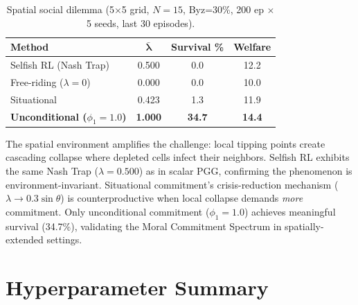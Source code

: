\documentclass{article}
\begin{document}
\begin{table}[h]
\centering
\caption{Spatial social dilemma (5$\times$5 grid, $N{=}15$, Byz=30\%, 200 ep $\times$ 5 seeds, last 30 episodes).}
\label{tab:spatial}
\begin{tabular}{lccc}
\toprule
\textbf{Method} & $\boldsymbol{\bar{\lambda}}$ & \textbf{Survival \%} & \textbf{Welfare} \\
\midrule
Selfish RL (Nash Trap) & 0.500 & 0.0 & 12.2 \\
Free-riding ($\lambda{=}0$) & 0.000 & 0.0 & 10.0 \\
Situational & 0.423 & 1.3 & 11.9 \\
\textbf{Unconditional ($\phi_1{=}1.0$)} & \textbf{1.000} & \textbf{34.7} & \textbf{14.4} \\
\bottomrule
\end{tabular}
\end{table}

\noindent The spatial environment amplifies the challenge: local tipping points create cascading collapse where depleted cells infect their neighbors.
Selfish RL exhibits the same Nash Trap ($\lambda = 0.500$) as in scalar PGG, confirming the phenomenon is environment-invariant.
Situational commitment's crisis-reduction mechanism ($\lambda \to 0.3\sin\theta$) is counterproductive when local collapse demands \emph{more} commitment.
Only unconditional commitment ($\phi_1 = 1.0$) achieves meaningful survival (34.7\%), validating the Moral Commitment Spectrum in spatially-extended settings.

\section{Hyperparameter Summary}
\label{app:hyperparams}
\end{document}
